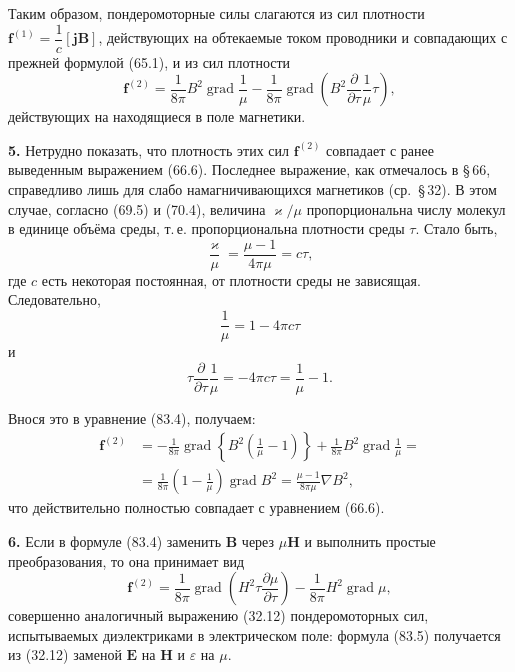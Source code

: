 \documentclass[a4paper,10pt]{article}
\begin{document}

Таким образом, пондеромоторные силы слагаются из сил плотности
$\mathbf{f}^{(1)} = \dfrac{1}{c}[\mathbf{j}\mathbf{B}]$, действующих
на обтекаемые током проводники и совпадающих с прежней формулой (65.1),
и из сил плотности
\begin{equation}
    \mathbf{f}^{(2)} = \frac{1}{8\pi}B^2\operatorname{grad}\frac{1}{\mu}
                     - \frac{1}{8\pi}\operatorname{grad}\!\left(
                         B^2\frac{\partial}{\partial\tau}\frac{1}{\mu}\tau
                     \right),
    \tag{83.4}
\end{equation}
действующих на находящиеся в поле магнетики.

\textbf{5.} Нетрудно показать, что плотность этих сил $\mathbf{f}^{(2)}$
совпадает с ранее выведенным выражением (66.6). Последнее выражение, как
отмечалось в §\,66, справедливо лишь для слабо намагничивающихся
магнетиков (ср.\ §\,32). В этом случае, согласно (69.5) и (70.4),
величина $\varkappa/\mu$ пропорциональна числу молекул в единице объёма
среды, т.\,е. пропорциональна плотности среды $\tau$. Стало быть,
$$
    \frac{\varkappa}{\mu} = \frac{\mu - 1}{4\pi\mu} = c\tau,
$$
где $c$ есть некоторая постоянная, от плотности среды не зависящая.
Следовательно,
$$
    \frac{1}{\mu} = 1 - 4\pi c\tau
$$
и
$$
    \tau\frac{\partial}{\partial\tau}\frac{1}{\mu} = -4\pi c\tau = \frac{1}{\mu} - 1.
$$

Внося это в уравнение (83.4), получаем:
\begin{align*}
    \mathbf{f}^{(2)} &= -\frac{1}{8\pi}\operatorname{grad}\!\left\{
        B^2\!\left(\frac{1}{\mu} - 1\right)
    \right\} + \frac{1}{8\pi}B^2\operatorname{grad}\frac{1}{\mu} = \\
    &= \frac{1}{8\pi}\!\left(1 - \frac{1}{\mu}\right)\operatorname{grad}B^2
     = \frac{\mu - 1}{8\pi\mu}\nabla B^2,
\end{align*}
что действительно полностью совпадает с уравнением (66.6).

\textbf{6.} Если в формуле (83.4) заменить $\mathbf{B}$ через $\mu\mathbf{H}$
и выполнить простые преобразования, то она принимает вид
\begin{equation}
    \mathbf{f}^{(2)} = \frac{1}{8\pi}\operatorname{grad}\!\left(
        H^2\tau\frac{\partial\mu}{\partial\tau}
    \right) - \frac{1}{8\pi}H^2\operatorname{grad}\mu,
    \tag{83.5}
\end{equation}
совершенно аналогичный выражению (32.12) пондеромоторных сил,
испытываемых диэлектриками в электрическом поле: формула (83.5)
получается из (32.12) заменой $\mathbf{E}$ на $\mathbf{H}$ и $\varepsilon$
на $\mu$.
\end{document}
